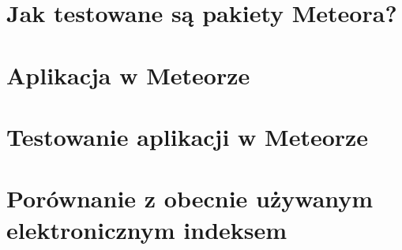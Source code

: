 \documentclass[brudnopis]{xmgr}
\begin{document}



      
\chapter{Jak testowane są pakiety Meteora?}

    

   

\chapter{Aplikacja w Meteorze}

\chapter{Testowanie aplikacji w Meteorze}

\chapter{Porównanie z obecnie używanym elektronicznym indeksem}

\summary

\end{document}
